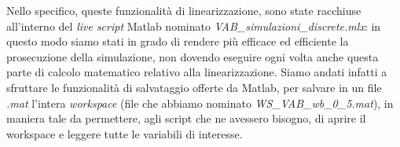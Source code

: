 Nello specifico, queste funzionalità di linearizzazione, sono state racchiuse all'interno del \textit{live script} Matlab nominato \textit{VAB\_simulazioni\_discrete.mlx}: in questo modo siamo stati in grado di rendere più efficace ed efficiente la prosecuzione della simulazione, non dovendo eseguire ogni volta anche questa parte di calcolo matematico relativo alla linearizzazione. Siamo andati infatti a sfruttare le funzionalità di salvataggio offerte da Matlab, per salvare in un file \textit{.mat} l'intera \textit{workspace} (file che abbiamo nominato \textit{WS\_VAB\_wb\_0\_5.mat}), in maniera tale da permettere, agli script che ne avessero bisogno, di aprire il workspace e leggere tutte le variabili di interesse.
